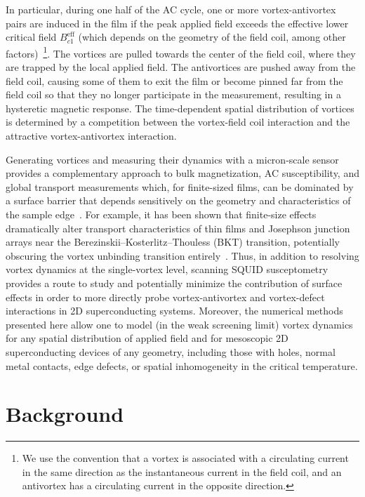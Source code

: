 \documentclass[%
 reprint,
 superscriptaddress,
 amsmath,
 amssymb,
 amsfonts,
 aps,
 prb,
]{revtex4-2}
\begin{document}
In particular, during one half of the AC cycle, one or more vortex-antivortex pairs are induced in the film if the peak applied field exceeds the effective lower critical field $B_{c1}^\mathrm{eff}$ (which depends on the geometry of the field coil, among other factors)~\footnote{We use the convention that a vortex is associated with a circulating current in the same direction as the instantaneous current in the field coil, and an antivortex has a circulating current in the opposite direction.}. The vortices are pulled towards the center of the field coil, where they are trapped by the local applied field. The antivortices are pushed away from the field coil, causing some of them to exit the film or become pinned far from the field coil so that they no longer participate in the measurement, resulting in a hysteretic magnetic response. The time-dependent spatial distribution of vortices is determined by a competition between the vortex-field coil interaction and the attractive vortex-antivortex interaction.

Generating vortices and measuring their dynamics with a micron-scale sensor provides a complementary approach to bulk magnetization, AC susceptibility, and global transport measurements which, for finite-sized films, can be dominated by a surface barrier that depends sensitively on the geometry and characteristics of the sample edge~\cite{Bean1964-hv, Hernandez2002-nx, Benfenati2020-mg}. For example, it has been shown that finite-size effects dramatically alter transport characteristics of thin films and Josephson junction arrays near the Berezinskii–Kosterlitz–Thouless (BKT) transition, potentially obscuring the vortex unbinding transition entirely~\cite{Herbert1998-ig, Gurevich2008-vi}. Thus, in addition to resolving vortex dynamics at the single-vortex level, scanning SQUID susceptometry provides a route to study and potentially minimize the contribution of surface effects in order to more directly probe vortex-antivortex and vortex-defect interactions in 2D superconducting systems. Moreover, the numerical methods presented here allow one to model (in the weak screening limit) vortex dynamics for any spatial distribution of applied field and for mesoscopic 2D superconducting devices of any geometry, including those with holes, normal metal contacts, edge defects, or spatial inhomogeneity in the critical temperature.

\section{Background}
\end{document}

